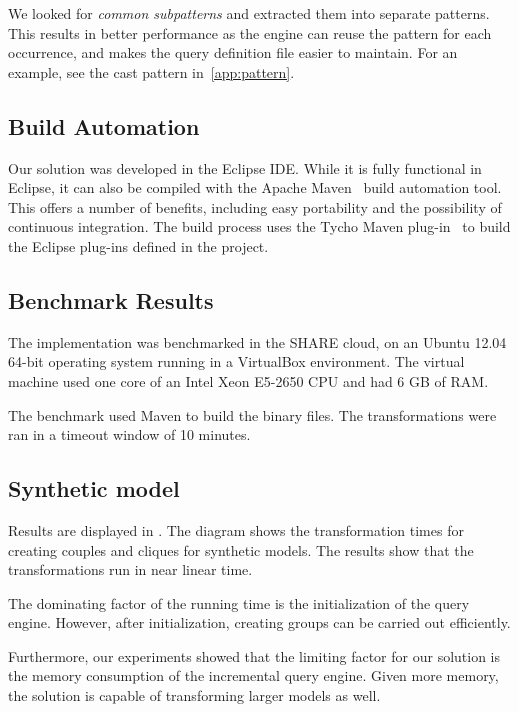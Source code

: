We looked for \emph{common subpatterns} and extracted them into separate patterns. This results in better performance as the engine can reuse the pattern for each occurrence, and makes the query definition file easier to maintain. For an example, see the \textsf{cast} pattern in~\ref{app:pattern}.

\subsection{Build Automation}

Our solution was developed in the Eclipse IDE. While it is fully functional in Eclipse, it can also be compiled with the Apache Maven~\cite{Maven} build automation tool. This offers a number of benefits, including easy portability and the possibility of continuous integration. The build process uses the Tycho Maven plug-in~\cite{tycho} to build the Eclipse plug-ins defined in the project.

\subsection{Benchmark Results}

The implementation was benchmarked in the SHARE cloud, on an Ubuntu 12.04 64-bit operating system running in a VirtualBox environment. The virtual machine used one core of an Intel Xeon E5-2650 CPU and had 6 GB of RAM.

The benchmark used Maven to build the binary files. The transformations were ran in a timeout window of 10 minutes.

\subsection{Synthetic model}

Results are displayed in . The diagram shows the transformation times for creating couples and cliques for synthetic models. The results show that the transformations run in near linear time.

The dominating factor of the running time is the initialization of the query engine. However, after initialization, creating groups can be carried out efficiently.

Furthermore, our experiments showed that the limiting factor for our solution is the memory consumption of the incremental query engine. Given more memory, the solution is capable of transforming larger models as well.

